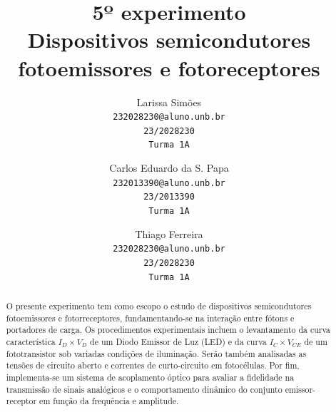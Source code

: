 \documentclass[10pt,twocolumn,letterpaper]{article}
\begin{document}
\title{5º experimento\\Dispositivos semicondutores fotoemissores e fotoreceptores}

\author{Larissa Simões\\
{\tt\small 232028230@aluno.unb.br}\\
{\tt\small 23/2028230}\\
{\tt\small Turma 1A}
\and
Carlos Eduardo da S. Papa\\
{\tt\small 232013390@aluno.unb.br}\\
{\tt\small 23/2013390}\\
{\tt\small Turma 1A}
\and
Thiago Ferreira\\
{\tt\small 232028230@aluno.unb.br}\\
{\tt\small 23/2028230}\\
{\tt\small Turma 1A}
}

\maketitle

\vspace{.25cm}

\begin{abstract}
\noindent\hspace{.3cm}O presente experimento tem como escopo o estudo de dispositivos semicondutores fotoemissores e fotorreceptores, fundamentando-se na interação entre fótons e portadores de carga. Os procedimentos experimentais incluem o levantamento da curva característica $I_D \times V_D$ de um Diodo Emissor de Luz (LED) e da curva $I_C \times V_{CE}$ de um fototransistor sob variadas condições de iluminação. Serão também analisadas as tensões de circuito aberto e correntes de curto-circuito em fotocélulas. Por fim, implementa-se um sistema de acoplamento óptico para avaliar a fidelidade na transmissão de sinais analógicos e o comportamento dinâmico do conjunto emissor-receptor em função da frequência e amplitude.
\end{abstract}









\end{document}
